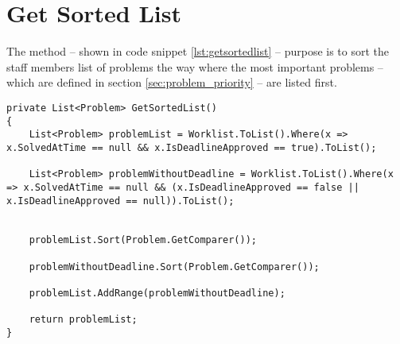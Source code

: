 \section{Get Sorted List}
\label{sec:getsortedlist}

The  method -- shown in code snippet \ref{lst:getsortedlist} -- purpose is to sort the staff members list of problems the way where the most important problems -- which are defined in section \ref{sec:problem_priority} -- are listed first. 



\begin{lstlisting}[style=sourceCode, caption=\myCaption{The ManageTagTimes method}, label=lst:getsortedlist]
private List<Problem> GetSortedList()
{
    List<Problem> problemList = Worklist.ToList().Where(x => x.SolvedAtTime == null && x.IsDeadlineApproved == true).ToList();

    List<Problem> problemWithoutDeadline = Worklist.ToList().Where(x => x.SolvedAtTime == null && (x.IsDeadlineApproved == false || x.IsDeadlineApproved == null)).ToList();


    problemList.Sort(Problem.GetComparer());

    problemWithoutDeadline.Sort(Problem.GetComparer());

    problemList.AddRange(problemWithoutDeadline);

    return problemList;
}
\end{lstlisting}
